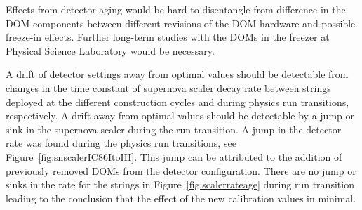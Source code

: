 

Effects from detector aging would be hard to disentangle from difference in the DOM components between different revisions of the DOM hardware and possible freeze-in effects. Further long-term studies with the DOMs in the freezer at Physical Science Laboratory would be necessary.

A drift of detector settings away from optimal values should be detectable from changes in the time constant of supernova scaler decay rate between strings deployed at the different construction cycles and during physics run transitions, respectively. A drift away from optimal values should be detectable by a jump or sink in the supernova scaler during the run transition. A jump in the detector rate was found during the physics run transitions, see Figure~\ref{fig:snscalerIC86ItoIII}. This jump can be attributed to the addition of previously removed DOMs from the detector configuration. There are no jump or sinks in the rate for the strings in Figure~\ref{fig:scalerrateage} during run transition leading to the conclusion that the effect of the new calibration values in minimal. 


